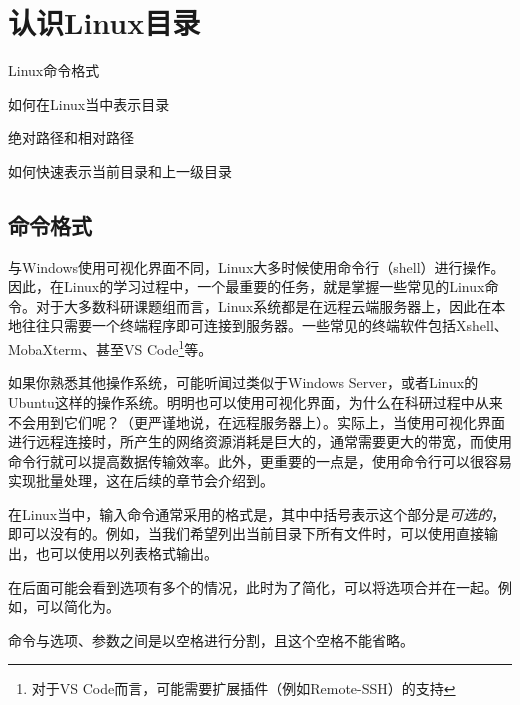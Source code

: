 \section{认识Linux目录}\label{sec:认识Linux目录}

\begin{Abstract}
    \item Linux命令格式
    \item 如何在Linux当中表示目录
    \item 绝对路径和相对路径
    \item 如何快速表示当前目录和上一级目录
\end{Abstract}


\subsection{命令格式}\label{subsec:认识Linux目录-命令格式}

与Windows使用可视化界面不同，Linux大多时候使用命令行（shell）进行操作。因此，在Linux的学习过程中，一个最重要的任务，就是掌握一些常见的Linux命令。对于大多数科研课题组而言，Linux系统都是在远程云端服务器上，因此在本地往往只需要一个终端程序即可连接到服务器。一些常见的终端软件包括Xshell、MobaXterm、甚至VS Code\footnote{对于VS Code而言，可能需要扩展插件（例如Remote-SSH）的支持}等。

\begin{attention}
    如果你熟悉其他操作系统，可能听闻过类似于Windows Server，或者Linux的Ubuntu这样的操作系统。明明也可以使用可视化界面，为什么在科研过程中从来不会用到它们呢？（更严谨地说，在远程服务器上）。实际上，当使用可视化界面进行远程连接时，所产生的网络资源消耗是巨大的，通常需要更大的带宽，而使用命令行就可以提高数据传输效率。此外，更重要的一点是，使用命令行可以很容易实现批量处理，这在后续的章节会介绍到。
\end{attention}

在Linux当中，输入命令通常采用的格式是，其中中括号表示这个部分是\emph{可选的}，即可以没有的。例如，当我们希望列出当前目录下所有文件时，可以使用直接输出，也可以使用以列表格式输出。

\begin{attention}
    在后面可能会看到选项有多个的情况，此时为了简化，可以将选项合并在一起。例如，可以简化为。

    命令与选项、参数之间是以空格进行分割，且这个空格不能省略。
\end{attention}

